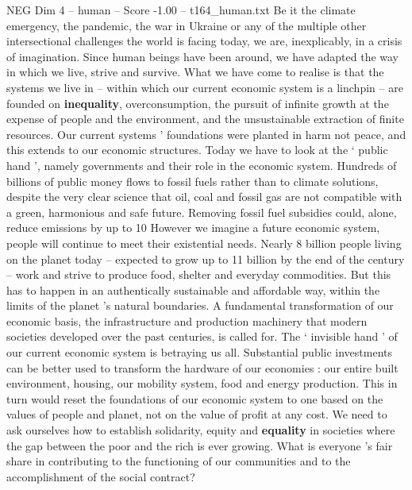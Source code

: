 \begin{textsample}{NEG Dim 4 – human – Score -1.00 – t164\_human.txt}  \label{ex:f4_neg_041}
Be it the climate emergency, the pandemic, the war in Ukraine or any of the multiple other intersectional challenges the world is facing today, we are, inexplicably, in a crisis of imagination.
Since human beings have been around, we have adapted the way in which we live, strive and survive.
What we have come to realise is that the systems we live in – within which our current economic system is a linchpin – are founded on \textbf{inequality}, overconsumption, the pursuit of infinite growth at the expense of people and the environment, and the unsustainable extraction of finite resources.
Our current systems ’ foundations were planted in harm not peace, and this extends to our economic structures.
Today we have to look at the ‘ public hand ’, namely governments and their role in the economic system.
Hundreds of billions of public money flows to fossil fuels rather than to climate solutions, despite the very clear science that oil, coal and fossil gas are not compatible with a green, harmonious and safe future.
Removing fossil fuel subsidies could, alone, reduce emissions by up to 10 %
However we imagine a future economic system, people will continue to meet their existential needs.
Nearly 8 billion people living on the planet today – expected to grow up to 11 billion by the end of the century – work and strive to produce food, shelter and everyday commodities.
But this has to happen in an authentically sustainable and affordable way, within the limits of the planet ’s natural boundaries.
A fundamental transformation of our economic basis, the infrastructure and production machinery that modern societies developed over the past centuries, is called for.
The ‘ invisible hand ’ of our current economic system is betraying us all.
Substantial public investments can be better used to transform the hardware of our economies : our entire built environment, housing, our mobility system, food and energy production.
This in turn would reset the foundations of our economic system to one based on the values of people and planet, not on the value of profit at any cost.
We need to ask ourselves how to establish solidarity, equity and \textbf{equality} in societies where the gap between the poor and the rich is ever growing.
What is everyone ’s fair share in contributing to the functioning of our communities and to the accomplishment of the social contract?

\end{textsample}
